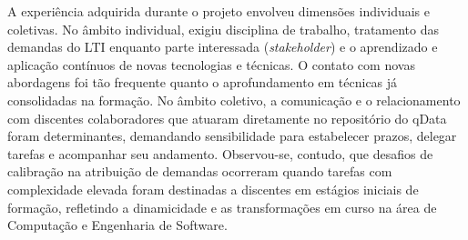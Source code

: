A experiência adquirida durante o projeto envolveu dimensões individuais e coletivas. No âmbito individual, exigiu disciplina de trabalho, tratamento das demandas do LTI enquanto parte interessada (\textit{stakeholder}) e o aprendizado e aplicação contínuos de novas tecnologias e técnicas. O contato com novas abordagens foi tão frequente quanto o aprofundamento em técnicas já consolidadas na formação. No âmbito coletivo, a comunicação e o relacionamento com discentes colaboradores que atuaram diretamente no repositório do qData foram determinantes, demandando sensibilidade para estabelecer prazos, delegar tarefas e acompanhar seu andamento. Observou-se, contudo, que desafios de calibração na atribuição de demandas ocorreram quando tarefas com complexidade elevada foram destinadas a discentes em estágios iniciais de formação, refletindo a dinamicidade e as transformações em curso na área de Computação e Engenharia de Software.